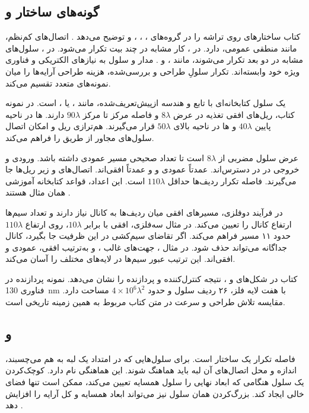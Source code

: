 \subsection{گونه‌های ساختار و }
کتاب ساختارهای روی تراشه را در گروه‌های ، ،
،  و  توضیح می‌دهد \cite[صفحه ۴۸]{weste}.
 اتصال‌های کم‌نظم، مانند  منطقی عمومی، دارد.
در ، کار مشابه در چند بیت تکرار می‌شود. در ، سلول‌های مشابه
در دو بعد تکرار می‌شوند، مانند ،  و .
مدار  و سلول  به نیازهای الکتریکی و فناوری ویژه خود وابسته‌اند.
تکرار سلولِ طراحی و بررسی‌شده، هزینه طراحی آرایه‌ها را میان نمونه‌های متعدد تقسیم می‌کند.

 یک سلول کتابخانه‌ای با تابع و هندسه ازپیش‌تعریف‌شده، مانند
،  یا ، است. در نمونه کتاب، ریل‌های افقی
تغذیه در  عرض \(8\lambda\) و فاصله مرکز تا مرکز \(90\lambda\) دارند.
ها در ناحیه پایین \(40\lambda\) و ها در ناحیه بالای
\(50\lambda\) قرار می‌گیرند. هم‌ترازی ریل و  امکان اتصال سلول‌های مجاور
از طریق  را فراهم می‌کند.

عرض سلول مضربی از \(8\lambda\) است تا تعداد صحیحی مسیر عمودی 
داشته باشد. ورودی و خروجی در  در دسترس‌اند.  عمدتاً عمودی و
 و  عمدتاً افقی‌اند. اتصال‌های  و
 زیر ریل‌ها جا می‌گیرند. فاصله تکرار ردیف‌ها حداقل \(110\lambda\) است.
این اعداد، قواعد کتابخانه آموزشی همان مثال هستند \cite[بخش ]{weste}.

در فرآیند دوفلزی، مسیرهای افقی میان ردیف‌ها به کانال نیاز دارند و تعداد سیم‌ها
ارتفاع کانال را تعیین می‌کند. در مثال سه‌فلزی،  افقی با
 برابر \(10\lambda\)، روی ارتفاع \(110\lambda\) حدود ۱۱ مسیر فراهم می‌کند.
اگر تقاضای سیم‌کشی در این ظرفیت جا بگیرد، کانال جداگانه می‌تواند حذف شود.
در مثال ، جهت‌های غالب ،  و 
به‌ترتیب افقی، عمودی و افقی‌اند. این ترتیب عبور سیم‌ها در لایه‌های مختلف را آسان می‌کند.

کتاب در شکل‌های  و ، نتیجه 
کنترل‌کننده و پردازنده را نشان می‌دهد. نمونه پردازنده در فناوری \qty{130}{\nano\metre}
با هفت لایه فلز، ۲۶ ردیف سلول و حدود \(4\times10^6\lambda^2\) مساحت دارد.
مقایسه تلاش طراحی و سرعت در متن کتاب مربوط به همین زمینه تاریخی است.

\subsection{ و }
 فاصله تکرار یک ساختار است. برای سلول‌هایی که در امتداد یک لبه به هم
می‌چسبند، اندازه و محل اتصال‌های آن لبه باید هماهنگ شوند. این هماهنگی
 نام دارد. کوچک‌کردن یک سلول هنگامی که ابعاد نهایی را سلول
همسایه تعیین می‌کند، ممکن است تنها فضای خالی ایجاد کند. بزرگ‌کردن همان سلول نیز
می‌تواند ابعاد همسایه و کل آرایه را افزایش دهد \cite[شکل ]{weste}.

